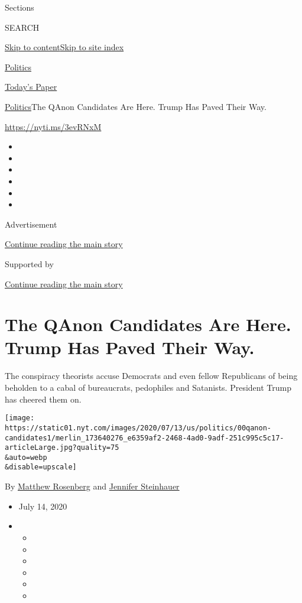 Sections

SEARCH

\protect\hyperlink{site-content}{Skip to
content}\protect\hyperlink{site-index}{Skip to site index}

\href{https://www.nytimes.com/section/politics}{Politics}

\href{https://myaccount.nytimes.com/auth/login?response_type=cookie\&client_id=vi}{}

\href{https://www.nytimes.com/section/todayspaper}{Today's Paper}

\href{/section/politics}{Politics}\textbar{}The QAnon Candidates Are
Here. Trump Has Paved Their Way.

\url{https://nyti.ms/3evRNxM}

\begin{itemize}
\item
\item
\item
\item
\item
\item
\end{itemize}

Advertisement

\protect\hyperlink{after-top}{Continue reading the main story}

Supported by

\protect\hyperlink{after-sponsor}{Continue reading the main story}

\hypertarget{the-qanon-candidates-are-here-trump-has-paved-their-way}{%
\section{The QAnon Candidates Are Here. Trump Has Paved Their
Way.}\label{the-qanon-candidates-are-here-trump-has-paved-their-way}}

The conspiracy theorists accuse Democrats and even fellow Republicans of
being beholden to a cabal of bureaucrats, pedophiles and Satanists.
President Trump has cheered them on.

\texttt{[image: https://static01.nyt.com/images/2020/07/13/us/politics/00qanon-candidates1/merlin\_173640276\_e6359af2-2468-4ad0-9adf-251c995c5c17-articleLarge.jpg?quality=75\\\&auto=webp\\\&disable=upscale]}

By \href{https://www.nytimes.com/by/matthew-rosenberg}{Matthew
Rosenberg} and
\href{https://www.nytimes.com/by/jennifer-steinhauer}{Jennifer
Steinhauer}

\begin{itemize}
\item
  July 14, 2020
\item
  \begin{itemize}
  \item
  \item
  \item
  \item
  \item
  \item
  \end{itemize}
\end{itemize}

